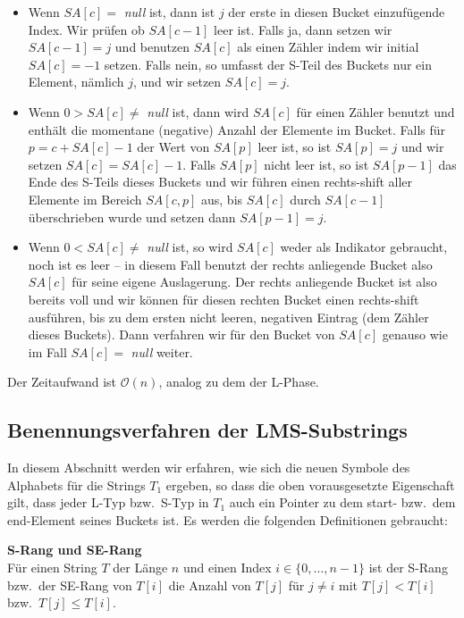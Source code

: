 \begin{itemize}
\item Wenn $SA[c] = $ \textit{null} ist, dann ist $j$ der erste in diesen Bucket einzufügende Index. Wir prüfen ob $SA[c-1]$ leer ist. Falls ja, dann setzen wir $SA[c-1] = j$ und benutzen $SA[c]$ als einen Zähler indem wir initial $SA[c] = -1$ setzen. Falls nein, so umfasst der S-Teil des Buckets nur ein Element, nämlich $j$, und wir setzen $SA[c] = j$.
\item Wenn $ 0 > SA[c] \neq$ \textit{null} ist, dann wird $SA[c]$ für einen Zähler benutzt und enthält die momentane (negative) Anzahl der Elemente im Bucket. Falls für $p = c + SA[c] - 1$ der Wert von $SA[p]$ leer ist, so ist $SA[p] = j$ und wir setzen $SA[c] = SA[c] - 1$. Falls $SA[p]$ nicht leer ist, so ist $SA[p-1]$ das Ende des S-Teils dieses Buckets und wir führen einen rechts-shift aller Elemente im Bereich $SA[c, p]$ aus, bis $SA[c]$ durch $SA[c-1]$ überschrieben wurde und setzen dann $SA[p-1] = j$.
\item Wenn $ 0 < SA[c] \neq$ \textit{null} ist, so wird $SA[c]$ weder als Indikator gebraucht, noch ist es leer -- in diesem Fall benutzt der rechts anliegende Bucket also $SA[c]$ für seine eigene Auslagerung. Der rechts anliegende Bucket ist also bereits voll und wir können für diesen rechten Bucket einen rechts-shift ausführen, bis zu dem ersten nicht leeren, negativen Eintrag (dem Zähler dieses Buckets). Dann verfahren wir für den Bucket von $SA[c]$ genauso wie im Fall $SA[c] = $ \textit{null} weiter.
\end{itemize}

Der Zeitaufwand ist $\mathcal O(n)$, analog zu dem der L-Phase.

\subsection{ Benennungsverfahren der LMS-Substrings}

In diesem Abschnitt werden wir erfahren, wie sich die neuen Symbole des Alphabets für die Strings $T_1$ ergeben, so dass die oben vorausgesetzte Eigenschaft gilt, dass jeder L-Typ bzw.\ S-Typ in $T_1$ auch ein Pointer zu dem start- bzw.\ dem end-Element seines Buckets ist. Es werden die folgenden Definitionen gebraucht:

\begin{definition}\textbf{S-Rang und SE-Rang}\\
Für einen String $T$ der Länge $n$ und einen Index $i \in \{0, \ldots, n-1\}$ ist der S-Rang bzw.\ der SE-Rang von $T[i]$ die Anzahl von $T[j]$ für $j \neq i$ mit $T[j] < T[i]$ bzw.\ $T[j] \leq T[i]$. 
\end{definition}

